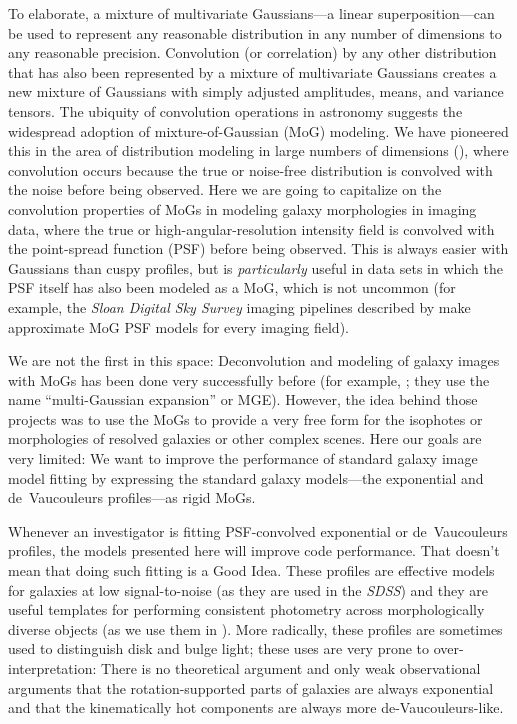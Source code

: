 \documentclass[12pt,pdftex,preprint]{aastex}
\newcommand{\project}[1]{\textsl{#1}}
\begin{document}
To elaborate, a mixture of multivariate Gaussians---a linear
superposition---can be used to represent any reasonable distribution
in any number of dimensions to any reasonable precision.  Convolution
(or correlation) by any other distribution that has also been
represented by a mixture of multivariate Gaussians creates a new
mixture of Gaussians with simply adjusted amplitudes, means, and
variance tensors.  The ubiquity of convolution operations in astronomy
suggests the widespread adoption of mixture-of-Gaussian (MoG)
modeling.  We have pioneered this in the area of distribution modeling
in large numbers of dimensions (\citealt{xd, xdqso, xdqsoz}), where
convolution occurs because the true or noise-free distribution is
convolved with the noise before being observed.  Here we are going to
capitalize on the convolution properties of MoGs in modeling galaxy
morphologies in imaging data, where the true or
high-angular-resolution intensity field is convolved with the
point-spread function (PSF) before being observed.  This is always
easier with Gaussians than cuspy profiles, but is \emph{particularly}
useful in data sets in which the PSF itself has also been modeled as a
MoG, which is not uncommon (for example, the \project{Sloan Digital
  Sky Survey} imaging pipelines described by \citealt{lupton} make
approximate MoG PSF models for every imaging field).

We are not the first in this space: Deconvolution and modeling of
galaxy images with MoGs has been done very successfully before (for
example, \citealt{bendinelli, emsellem, bendinelli2, cappellari}; they
use the name ``multi-Gaussian expansion'' or MGE).  However, the idea
behind those projects was to use the MoGs to provide a very free form
for the isophotes or morphologies of resolved galaxies or other
complex scenes.  Here our goals are very limited: We want to improve
the performance of standard galaxy image model fitting by expressing
the standard galaxy models---the exponential and de~Vaucouleurs
profiles---as rigid MoGs.

Whenever an investigator is fitting PSF-convolved exponential or
de~Vaucouleurs profiles, the models presented here will improve code
performance.  That doesn't mean that doing such fitting is a Good
Idea.  These profiles are effective models for galaxies at low
signal-to-noise (as they are used in the \project{SDSS}) and they are
useful templates for performing consistent photometry across
morphologically diverse objects (as we use them in \citealt{bundy}).
More radically, these profiles are sometimes used to distinguish disk
and bulge light; these uses are very prone to over-interpretation:
There is no theoretical argument and only weak observational arguments
that the rotation-supported parts of galaxies are always exponential
and that the kinematically hot components are always more
de-Vaucouleurs-like.
\end{document}
